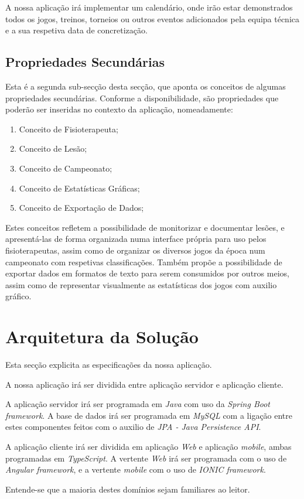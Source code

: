 A nossa aplicação irá implementar um calendário, onde irão estar demonstrados todos os jogos, treinos, torneios ou outros eventos adicionados pela equipa técnica e a sua respetiva data de concretização.



\subsection{Propriedades Secundárias} \label{sec222}
Esta é a segunda sub-secção desta secção, que aponta os conceitos de algumas propriedades secundárias. Conforme a disponibilidade, são propriedades que poderão ser inseridas no contexto da aplicação, nomeadamente:
\begin{enumerate}
	\item Conceito de Fisioterapeuta;
	\item Conceito de Lesão;
	\item Conceito de Campeonato;
	\item Conceito de Estatísticas Gráficas;
	\item Conceito de Exportação de Dados;
\end{enumerate}

Estes conceitos refletem a possibilidade de monitorizar e documentar lesões, e apresentá-las de forma organizada numa interface própria para uso pelos fisioterapeutas, assim como de organizar os diversos jogos da época num campeonato com respetivas classificações. Também propõe a possibilidade de exportar dados em formatos de texto para serem consumidos por outros meios, assim como de representar visualmente as estatísticas dos jogos com auxilio gráfico.

\section{Arquitetura da Solução}\label{sec23}
Esta secção explicita as especificações da nossa aplicação.

A nossa aplicação irá ser dividida entre aplicação servidor e aplicação cliente.

A aplicação servidor irá ser programada em \emph{Java} com uso da \emph{Spring Boot framework}. A base de dados irá ser programada em \emph{MySQL} com a ligação entre estes componentes feitos com o auxilio de \emph{JPA - Java Persistence API}.

A aplicação cliente irá ser dividida em aplicação \emph{Web} e aplicação \emph{mobile}, ambas programadas em \emph{TypeScript}. A vertente \emph{Web} irá ser programada com o uso de \emph{Angular framework}, e a vertente \emph{mobile} com o uso de \emph{IONIC framework}.

Entende-se que a maioria destes domínios sejam familiares ao leitor.

